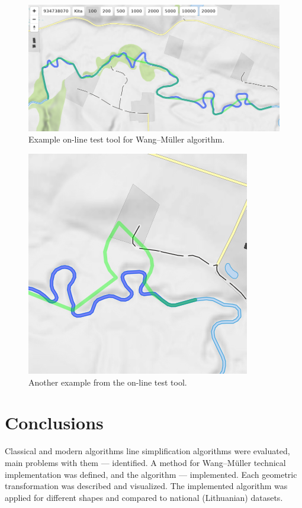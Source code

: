 \documentclass[a4paper]{article}
\newcommand{\WM}{Wang--M{\"u}ller}
\begin{document}
\begin{figure}[ht]
    \centering
    \includegraphics[width=\textwidth]{openmap-wm-good.png}
    \caption{Example on-line test tool for {\WM} algorithm.}
    \label{fig:openmap-wm-good}
\end{figure}

\begin{figure}[ht]
    \centering
    \includegraphics[width=.5\textwidth]{openmap-wm-bad.png}
    \caption{Another example from the on-line test tool.}
    \label{fig:openmap-wm-bad}
\end{figure}

\section{Conclusions}
\label{sec:conclusions}

Classical and modern algorithms line simplification algorithms were evaluated,
main problems with them --- identified. A method for {\WM} technical
implementation was defined, and the algorithm --- implemented. Each geometric
transformation was described and visualized. The implemented algorithm was
applied for different shapes and compared to national (Lithuanian) datasets.
\end{document}
